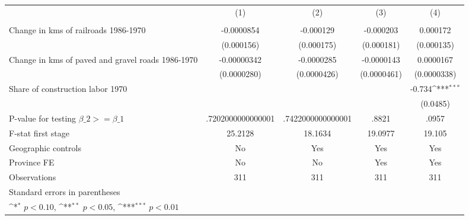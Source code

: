 {
\def\sym#1{\ifmmode^{#1}\else\(^{#1}\)\fi}
\begin{tabular}{l*{4}{c}}
\hline\hline
                &\multicolumn{1}{c}{(1)}&\multicolumn{1}{c}{(2)}&\multicolumn{1}{c}{(3)}&\multicolumn{1}{c}{(4)}\\
                &\multicolumn{1}{c}{}&\multicolumn{1}{c}{}&\multicolumn{1}{c}{}&\multicolumn{1}{c}{}\\
\hline
Change in kms of railroads 1986-1970&-0.0000854         &-0.000129         &-0.000203         & 0.000172         \\
                &(0.000156)         &(0.000175)         &(0.000181)         &(0.000135)         \\
[1em]
Change in kms of paved and gravel roads 1986-1970&-0.00000342         &-0.0000285         &-0.0000143         &0.0000167         \\
                &(0.0000280)         &(0.0000426)         &(0.0000461)         &(0.0000338)         \\
[1em]
Share of construction labor 1970&                  &                  &                  &   -0.734\sym{***}\\
                &                  &                  &                  & (0.0485)         \\
\hline
P-value for testing $\beta\_{2} >= \beta\_{1}$&.7202000000000001         &.7422000000000001         &    .8821         &    .0957         \\
F-stat first stage&  25.2128         &  18.1634         &  19.0977         &   19.105         \\
Geographic controls&       No         &      Yes         &      Yes         &      Yes         \\
Province FE     &       No         &       No         &      Yes         &      Yes         \\
Observations    &      311         &      311         &      311         &      311         \\
\hline\hline
\multicolumn{5}{l}{\footnotesize Standard errors in parentheses}\\
\multicolumn{5}{l}{\footnotesize \sym{*} \(p<0.10\), \sym{**} \(p<0.05\), \sym{***} \(p<0.01\)}\\
\end{tabular}
}
